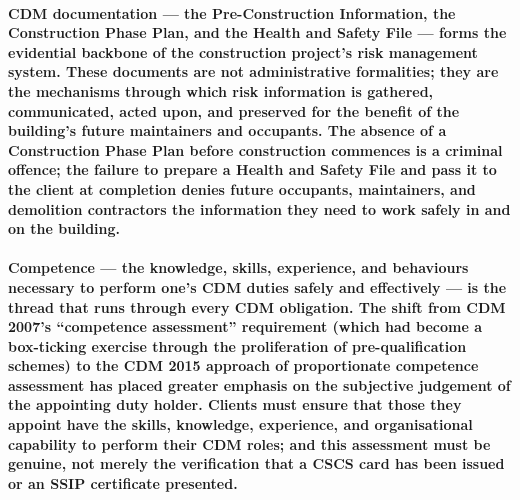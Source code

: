 \paragraph{CDM documentation --- the Pre-Construction Information, the Construction Phase Plan, and the Health and Safety File --- forms the evidential backbone of the construction project's risk management system. These documents are not administrative formalities; they are the mechanisms through which risk information is gathered, communicated, acted upon, and preserved for the benefit of the building's future maintainers and occupants. The absence of a Construction Phase Plan before construction commences is a criminal offence; the failure to prepare a Health and Safety File and pass it to the client at completion denies future occupants, maintainers, and demolition contractors the information they need to work safely in and on the building.}

\paragraph{Competence --- the knowledge, skills, experience, and behaviours necessary to perform one's CDM duties safely and effectively --- is the thread that runs through every CDM obligation. The shift from CDM 2007's ``competence assessment'' requirement (which had become a box-ticking exercise through the proliferation of pre-qualification schemes) to the CDM 2015 approach of proportionate competence assessment has placed greater emphasis on the subjective judgement of the appointing duty holder. Clients must ensure that those they appoint have the skills, knowledge, experience, and organisational capability to perform their CDM roles; and this assessment must be genuine, not merely the verification that a CSCS card has been issued or an SSIP certificate presented.}



